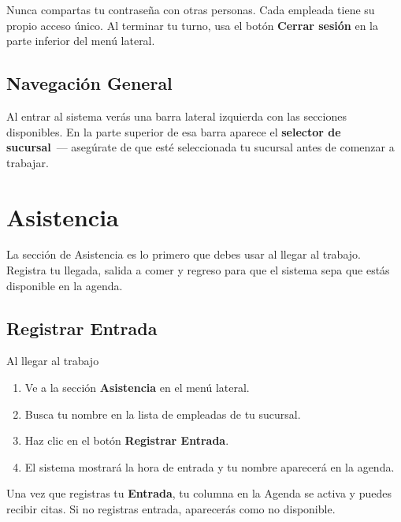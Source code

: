 \documentclass[12pt,a4paper]{article}
\begin{document}
\begin{alertabox}
Nunca compartas tu contraseña con otras personas. Cada empleada tiene su propio acceso único. Al terminar tu turno, usa el botón \textbf{Cerrar sesión} en la parte inferior del menú lateral.
\end{alertabox}

\subsection{Navegación General}

Al entrar al sistema verás una barra lateral izquierda con las secciones disponibles. En la parte superior de esa barra aparece el \textbf{selector de sucursal}~--- asegúrate de que esté seleccionada tu sucursal antes de comenzar a trabajar.

\newpage
\section{Asistencia}

La sección de Asistencia es lo primero que debes usar al llegar al trabajo. Registra tu llegada, salida a comer y regreso para que el sistema sepa que estás disponible en la agenda.

\subsection{Registrar Entrada}

\begin{pasobox}{Al llegar al trabajo}
\begin{enumerate}[leftmargin=*]
  \item Ve a la sección \textbf{Asistencia} en el menú lateral.
  \item Busca tu nombre en la lista de empleadas de tu sucursal.
  \item Haz clic en el botón \textbf{Registrar Entrada}.
  \item El sistema mostrará la hora de entrada y tu nombre aparecerá en la agenda.
\end{enumerate}
\end{pasobox}

\begin{notabox}
Una vez que registras tu \textbf{Entrada}, tu columna en la Agenda se activa y puedes recibir citas. Si no registras entrada, aparecerás como no disponible.
\end{notabox}
\end{document}
